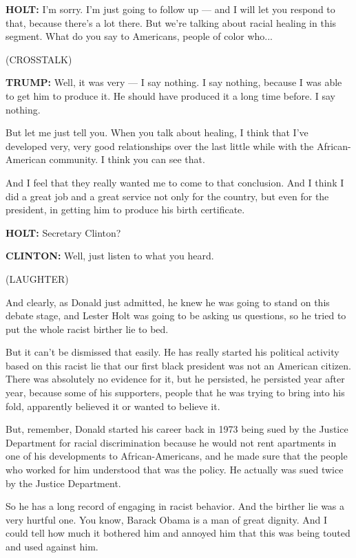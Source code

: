 \textbf{HOLT:} I'm sorry. I'm just going to follow up --- and I will let
you respond to that, because there's a lot there. But we're talking
about racial healing in this segment. What do you say to Americans,
people of color who...

(CROSSTALK)

\textbf{TRUMP:} Well, it was very --- I say nothing. I say nothing,
because I was able to get him to produce it. He should have produced it
a long time before. I say nothing.

But let me just tell you. When you talk about healing, I think that I've
developed very, very good relationships over the last little while with
the African-American community. I think you can see that.

And I feel that they really wanted me to come to that conclusion. And I
think I did a great job and a great service not only for the country,
but even for the president, in getting him to produce his birth
certificate.

\textbf{HOLT:} Secretary Clinton?

\textbf{CLINTON:} Well, just listen to what you heard.

(LAUGHTER)

And clearly, as Donald just admitted, he knew he was going to stand on
this debate stage, and Lester Holt was going to be asking us questions,
so he tried to put the whole racist birther lie to bed.

But it can't be dismissed that easily. He has really started his
political activity based on this racist lie that our first black
president was not an American citizen. There was absolutely no evidence
for it, but he persisted, he persisted year after year, because some of
his supporters, people that he was trying to bring into his fold,
apparently believed it or wanted to believe it.

But, remember, Donald started his career back in 1973 being sued by the
Justice Department for racial discrimination because he would not rent
apartments in one of his developments to African-Americans, and he made
sure that the people who worked for him understood that was the policy.
He actually was sued twice by the Justice Department.

So he has a long record of engaging in racist behavior. And the birther
lie was a very hurtful one. You know, Barack Obama is a man of great
dignity. And I could tell how much it bothered him and annoyed him that
this was being touted and used against him.

